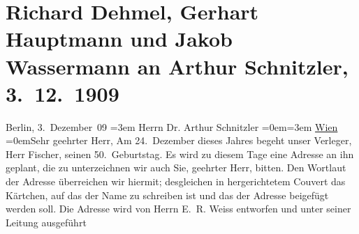 

         
         \renewcommand{\erwaehntePersonen}{Personen: Samuel Fischer, Emil Rudolf Weiß}
         \renewcommand{\erwaehnteOrte}{Orte: Berlin, Deutschland, Wien}
         \renewcommand{\erwaehnteWerke}{}
               \section[Richard Dehmel, Gerhart Hauptmann und Jakob Wassermann an Arthur Schnitzler, 3. 12. 1909]{ Richard Dehmel, Gerhart Hauptmann und Jakob Wassermann an Arthur
               Schnitzler, 3. 12. 1909}\nopagebreak{}\rehead{ }\begin{ledgroupsized}[t]{13cm}\normalsize\beginnumbering \toendnotes[C]{\smallbreak\pagebreak[2]} 
\pstart
           \raggedleft{}{\pb}Berlin, 3. Dezember 09\pend
           \leftskip=3em{}\pstart
           \noindent{}Herrn Dr. Arthur Schnitzler\pend
           \leftskip=0em{}\leftskip=3em{}\pstart
           \uline{Wien}\pend
           \leftskip=0em{}\pstart{}Sehr geehrter Herr,\pend\pstart
           Am 24. Dezember dieses Jahres begeht unser Verleger, Herr Fischer, seinen 50. Geburtstag. Es wird zu
               diesem Tage eine Adresse an ihn geplant, die zu unterzeichnen wir auch Sie, geehrter
               Herr, bitten. Den Wortlaut der Adresse überreichen wir hiermit; desgleichen in
               hergerichtetem Couvert das Kärtchen, auf das der Name zu schreiben ist und das der
               Adresse beigefügt werden soll. Die Adresse wird von Herrn E. R. Weiss entworfen und unter seiner Leitung ausgeführt

\end{ledgroupsized}
